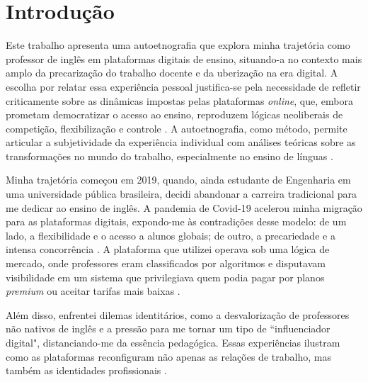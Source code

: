 \documentclass[portuguese]{textolivre}
\begin{document}
\begin{polyabstract}
\begin{english}
\begin{abstract}
\end{abstract}
\end{english}
\end{polyabstract}

\section{Introdução}
Este trabalho apresenta uma autoetnografia que explora minha trajetória como professor de inglês em plataformas digitais de ensino, situando-a no contexto mais amplo da precarização do trabalho docente e da uberização na era digital. A escolha por relatar essa experiência pessoal justifica-se pela necessidade de refletir criticamente sobre as dinâmicas impostas pelas plataformas \textit{online}, que, embora prometam democratizar o acesso ao ensino, reproduzem lógicas neoliberais de competição, flexibilização e controle \cite{abilio2021, antunes2020}. A autoetnografia, como método, permite articular a subjetividade da experiência individual com análises teóricas sobre as transformações no mundo do trabalho, especialmente no ensino de línguas \cite{adams2015}.

Minha trajetória começou em 2019, quando, ainda estudante de Engenharia em uma universidade pública brasileira, decidi abandonar a carreira tradicional para me dedicar ao ensino de inglês. A pandemia de Covid-19 acelerou minha migração para as plataformas digitais, expondo-me às contradições desse modelo: de um lado, a flexibilidade e o acesso a alunos globais; de outro, a precariedade e a intensa concorrência \cite{cavazzani2024, standing2014, gonsales2020}. A plataforma que utilizei operava sob uma lógica de mercado, onde professores eram classificados por algoritmos e disputavam visibilidade em um sistema que privilegiava quem podia pagar por planos \textit{premium} ou aceitar tarifas mais baixas \cite{block-gray2012}.

Além disso, enfrentei dilemas identitários, como a desvalorização de professores não nativos de inglês e a pressão para me tornar um tipo de ``influenciador digital", distanciando-me da essência pedagógica. Essas experiências ilustram como as plataformas reconfiguram não apenas as relações de trabalho, mas também as identidades profissionais \cite{moura2021}.
\end{document}
